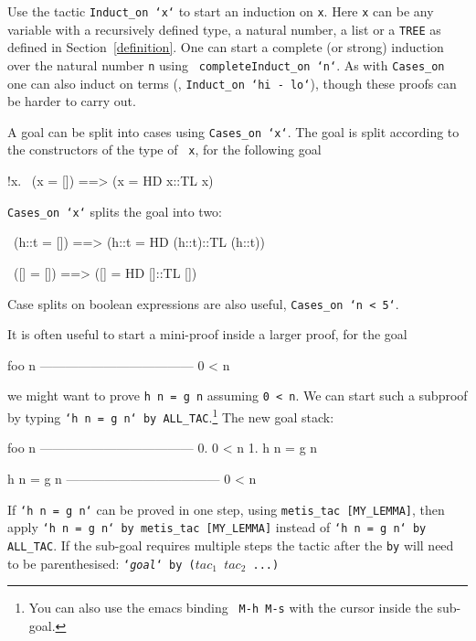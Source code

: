 \documentclass[a4paper,10pt]{article}
\begin{document}

Use the tactic {\tt\small Induct\_on `x`} to start an induction on {\tt\small x}.
Here {\tt x} can be any variable with a recursively defined type,
\eg{} a natural number, a list or a {\tt\small TREE} as defined in
Section~\ref{definition}.  One can start a complete (or strong)
induction over the natural number {\tt\small n} using {\tt\small
  completeInduct\_on `n`}.
As with \texttt{Cases\_on} one can also induct on terms (\eg, \texttt{\small Induct\_on~`hi~-~lo`}), though these proofs can be harder to carry out.


A goal can be split into cases using {\tt\small Cases\_on `x`}. The
goal is split according to the constructors of the type of {\tt\small
  x}, \eg{} for the following goal
\begin{code}
    !x. ~(x = []) ==> (x = HD x::TL x)
\end{code}
{\tt\small Cases\_on `x`} splits the goal into two:
\begin{code}
    ~(h::t = []) ==> (h::t = HD (h::t)::TL (h::t))

    ~([] = []) ==> ([] = HD []::TL [])
\end{code}
Case splits on boolean expressions are also useful, \eg{} {\tt\small Cases\_on `n < 5`}.


It is often useful to start a mini-proof inside a larger proof, \eg{} for the goal
\begin{code}
    foo n
    ------------------------------------
      0 < n
\end{code}
we might want to prove {\tt\small h n = g n} assuming {\tt\small 0 <
  n}.
We can start such a subproof by typing {\tt\small `h n = g n`
  by ALL\_TAC}.\footnote{You can also use the emacs binding {\tt\small
    M-h M-s} with the cursor inside the sub-goal.} The new goal stack:
\begin{code}
    foo n
    ------------------------------------
      0.  0 < n
      1.  h n = g n

    h n = g n
    ------------------------------------
      0 < n
\end{code}
If {\tt\small `h n = g n`} can be proved in one step, \eg{} using {\tt\small metis\_tac [MY\_LEMMA]}, then
apply {\tt\small `h n = g n` by metis\_tac [MY\_LEMMA]} instead of
{\tt\small `h n = g n` by ALL\_TAC}.  If the sub-goal requires
multiple steps the tactic after the \texttt{by} will need to be
parenthesised: {\tt\small`\textit{goal}` by ($\mathit{tac}_1$ \ml{\gt\gt}
  $\mathit{tac}_2$ ...)}
\end{document}
